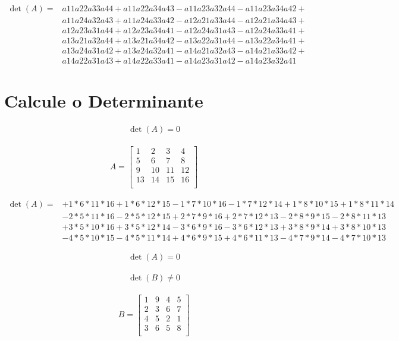 \documentclass{article}
\begin{document}
\begin{align*}
  \det(A)=&a11a22a33a44+a11a22a34a43-a11a23a32a44-a11a23a34a42+ \\
          &a11a24a32a43+a11a24a33a42-a12a21a33a44-a12a21a34a43+ \\
          &a12a23a31a44+a12a23a34a41-a12a24a31a43-a12a24a33a41+ \\
          &a13a21a32a44+a13a21a34a42-a13a22a31a44-a13a22a34a41+ \\
          &a13a24a31a42+a13a24a32a41-a14a21a32a43-a14a21a33a42+ \\
          &a14a22a31a43+a14a22a33a41-a14a23a31a42-a14a23a32a41
\end{align*}

\pagebreak

\section{Calcule o Determinante}

\begin{align*}
  \det(A)=0
\end{align*}

\begin{align*}
  A = \begin{bmatrix}
    1 & 2 & 3 & 4 \\
    5 & 6 & 7 & 8 \\
    9 & 10 & 11 & 12 \\
    13 & 14 & 15 & 16 \\
    \end{bmatrix}
\end{align*}

\begin{align*}
  \det(A)=&+1*6*11*16+1*6*12*15-1*7*10*16-1*7*12*14+1*8*10*15+1*8*11*14 \\
    &-2*5*11*16-2*5*12*15+2*7*9*16+2*7*12*13-2*8*9*15-2*8*11*13 \\
    &+3*5*10*16+3*5*12*14-3*6*9*16-3*6*12*13+3*8*9*14+3*8*10*13 \\
    &-4*5*10*15-4*5*11*14+4*6*9*15+4*6*11*13-4*7*9*14-4*7*10*13
\end{align*}

\begin{align*}
  \det(A)=0
\end{align*}

\begin{align*}
  \det(B)\ne0
\end{align*}

\begin{align*}
  B = \begin{bmatrix}
  1 & 9 & 4 & 5 \\
  2 & 3 & 6 & 7 \\
  4 & 5 & 2 & 1 \\
  3 & 6 & 5 & 8 \\
  \end{bmatrix}
\end{align*}
\end{document}

